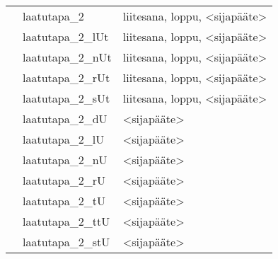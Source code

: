 \begin{tabular}{|l|l|l|}
         & laatutapa\_2      & liitesana, loppu, <sijapääte> \\
         & laatutapa\_2\_lUt & liitesana, loppu, <sijapääte> \\
         & laatutapa\_2\_nUt & liitesana, loppu, <sijapääte> \\
         & laatutapa\_2\_rUt & liitesana, loppu, <sijapääte> \\
         & laatutapa\_2\_sUt & liitesana, loppu, <sijapääte> \\
         & laatutapa\_2\_dU  & <sijapääte> \\
         & laatutapa\_2\_lU  & <sijapääte> \\
         & laatutapa\_2\_nU  & <sijapääte> \\
         & laatutapa\_2\_rU  & <sijapääte> \\
         & laatutapa\_2\_tU  & <sijapääte> \\
         & laatutapa\_2\_ttU & <sijapääte> \\
         & laatutapa\_2\_stU & <sijapääte> \\
\hline
\end{tabular}
